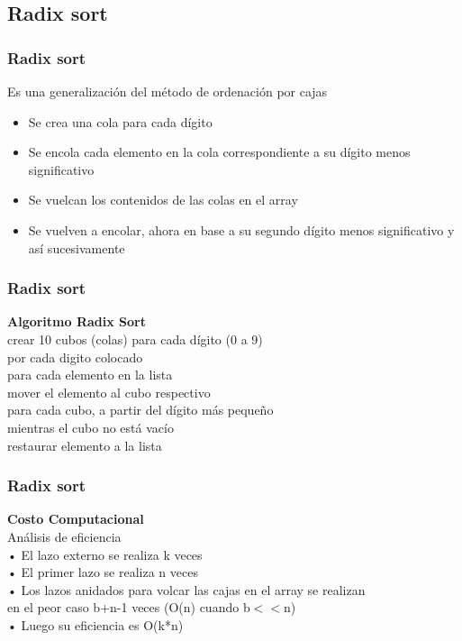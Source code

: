 \documentclass{beamer}
\begin{document}
\subsection{Radix sort}
 \begin{frame}
 \frametitle{Radix sort}
    \begin{block}{}
Es una generalización del método de ordenación por cajas\\
\begin{itemize}
    \item Se crea una cola para cada dígito
    \item Se encola cada elemento en la cola correspondiente a su dígito menos significativo
    \item Se vuelcan los contenidos de las colas en el array
    \item Se vuelven a encolar, ahora en base a su segundo dígito menos significativo y así sucesivamente
\end{itemize}
  \end{block}  
\end{frame}
\begin{frame}
 \frametitle{Radix sort}
    \begin{block}{}
\textbf{Algoritmo Radix Sort}\\
\tab crear 10 cubos (colas) para cada dígito (0 a 9)\\
\tab por cada digito colocado\\
\tab   para cada elemento en la lista\\
\tab \tab     mover el elemento al cubo respectivo\\
\tab   para cada cubo, a partir del dígito más pequeño\\
\tab \tab     mientras el cubo no está vacío\\
\tab \tab      restaurar elemento a la lista\\
  \end{block}  
\end{frame}
 \begin{frame}
 \frametitle{Radix sort}
    \begin{block}{}
\textbf{Costo Computacional}\\
Análisis de eficiencia\\
• El lazo externo se realiza k veces\\
• El primer lazo se realiza n veces\\
• Los lazos anidados para volcar las cajas en el array se realizan\\
en el peor caso b+n-1 veces (O(n) cuando b$<<$n)\\
• Luego su eficiencia es O(k*n)
  \end{block}  
\end{frame}
\end{document}
